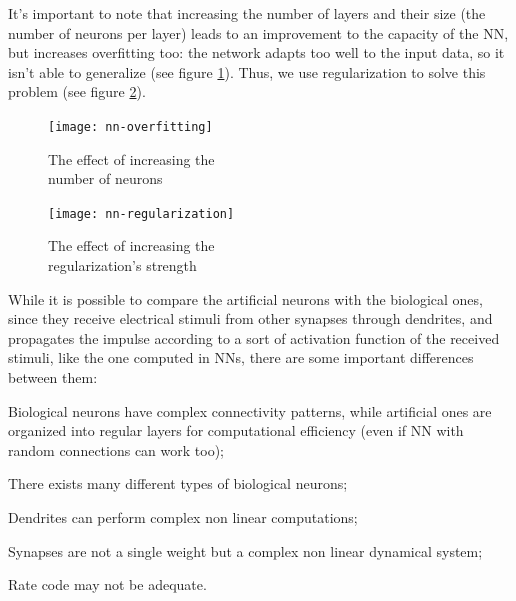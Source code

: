 It's important to note that increasing the number of layers and their size (the number of neurons per layer) leads to an improvement to the capacity of the NN, but increases overfitting too: the network adapts too well to the input data, so it isn't able to generalize (see figure \ref{fig:dl-overfitting}). Thus, we use regularization to solve this problem (see figure \ref{fig:dl-regularization}).

\begin{minipage}{.5\linewidth}
    \begin{figure}[H]
        \centering
        \texttt{[image: nn-overfitting]}
        \caption[The effect of increasing the number of neurons]{The effect of increasing the\\ number of neurons}
        \label{fig:dl-overfitting}
    \end{figure}
\end{minipage}
\begin{minipage}{.5\linewidth}
    \begin{figure}[H]
        \centering
        \texttt{[image: nn-regularization]}
        \caption[The effect of increasing the regularization's strength]{The effect of increasing the\\ regularization's strength}
        \label{fig:dl-regularization}
    \end{figure}
\end{minipage}

While it is possible to compare the artificial neurons with the biological ones, since they receive electrical stimuli from other synapses through dendrites, and propagates the impulse according to a sort of activation function of the received stimuli, like the one computed in NNs, there are some important differences between them:
\begin{myitem}
    \item Biological neurons have complex connectivity patterns, while artificial ones are organized into regular layers for computational efficiency (even if NN with random connections can work too);
    \item There exists many different types of biological neurons;
    \item Dendrites can perform complex non linear computations;
    \item Synapses are not a single weight but a complex non linear dynamical system;
    \item Rate code may not be adequate.
\end{myitem}

